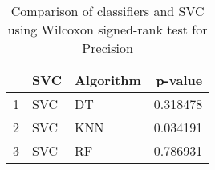 \begin{table}
\footnotesize
\caption{Comparison of classifiers and SVC using Wilcoxon signed-rank test for Precision}
\label{tab:SVC wilcoxon Precision comparison}
\begin{tabular}{lllr}
\hline
 & SVC & Algorithm & p-value \\
\hline
1 & SVC & DT & 0.318478 \\
2 & SVC & KNN & 0.034191 \\
3 & SVC & RF & 0.786931 \\
\hline
\end{tabular}
\end{table}
